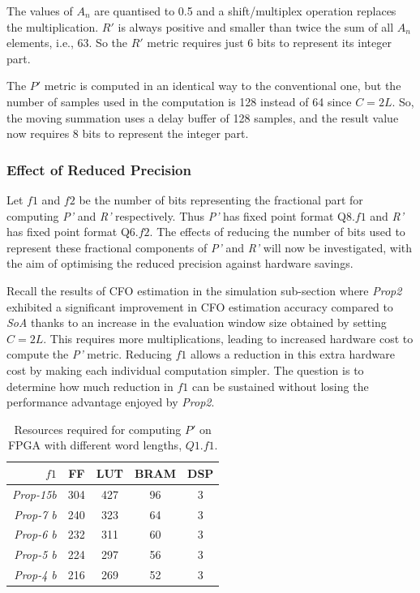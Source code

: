 The values of $A_n$ are quantised to 0.5 and a shift/multiplex operation replaces the multiplication.
$R'$ is always positive and smaller than twice the sum of all $A_n$ elements, i.e., 63. So the $R'$ metric requires just 6 bits to represent its integer part.

The $P'$ metric is computed in an identical way to the conventional one, but the number of samples used in the computation is 128 instead of 64 since $C=2L$.
So, the moving summation uses a delay buffer of 128 samples, and the result value now requires 8 bits to represent the integer part.

\subsubsection{Effect of Reduced Precision}

Let $f1$ and $f2$ be the number of bits representing the fractional part for computing \emph{P'}  and \emph{R'} respectively. Thus \emph{P'} has fixed point format Q8.$f1$ and \emph{R'} has fixed point format Q6.$f2$.
The effects of reducing the number of bits used to represent these fractional components of  \emph{P'}  and \emph{R'}  will now be investigated, with the aim of optimising the reduced precision against hardware savings.

Recall the results of CFO estimation in the simulation sub-section where \textit{Prop2} exhibited a significant improvement in CFO estimation accuracy compared to \textit{SoA} thanks to an increase in the evaluation window size obtained by setting $C=2L$. This requires more multiplications, leading to increased hardware cost to compute the \emph{P'} metric. Reducing $f1$ allows a reduction in this extra hardware cost by making each individual computation simpler. The question is to determine how much reduction in $f1$ can be sustained without losing the performance advantage enjoyed by \textit{Prop2}.

\begin{table}[hb]
	\centering
	\caption{Resources required for computing $P'$ on FPGA with different word lengths, $Q1.f1$.}
	\label{tab:P-Metric}
	\begin{tabular}{r|c|c|c|c}
        \hline \hline
    			 {$f1$}	&  {FF}	&  {LUT}  &  {BRAM} &  {DSP}\\
	\hline
		\textit{Prop-15b}	& 304 	& 427 	& 96	& 3 \\
		\textit{Prop-7 b}		& 240 	& 323	& 64 	& 3 \\
		\textit{Prop-6 b}		& 232 	& 311	& 60 	& 3 \\
		\textit{Prop-5 b}		& 224  	& 297  	& 56	& 3 \\
		\textit{Prop-4 b}		& 216  	& 269  	& 52	& 3 \\
	\hline \hline
    \end{tabular}
\end{table}


